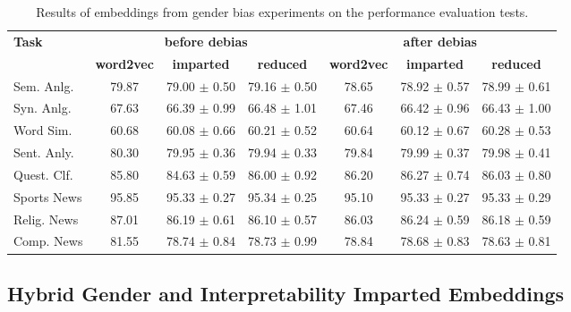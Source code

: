 \documentclass[11pt,a4paper]{article}
\begin{document}
\begin{table}
    \centering
	\begin{tabular}{lcccccc}
		\hline \hline 
		\multirow{2}{*}{\textbf{Task}} & \multicolumn{3}{c}{\textbf{before debias}} & 
		\multicolumn{3}{c}{\textbf{after debias}} \\
		 & \textbf{word2vec} & \textbf{imparted} & \textbf{reduced} & \textbf{word2vec} & \textbf{imparted} & \textbf{reduced} \\ \hline \hline %
	    Sem. Anlg. & 79.87 & 79.00 $\pm$ 0.50 & 79.16 $\pm$ 0.50 & 78.65 & 78.92 $\pm$ 0.57 & 78.99 $\pm$ 0.61 \\
	    Syn. Anlg. & 67.63 & 66.39 $\pm$ 0.99 & 66.48 $\pm$ 1.01 & 67.46 & 66.42 $\pm$ 0.96 & 66.43 $\pm$ 1.00 \\ 
	    \hline %
	    Word Sim. & 60.68 & 60.08 $\pm$ 0.66 & 60.21 $\pm$ 0.52 & 60.64 & 60.12 $\pm$ 0.67 & 60.28 $\pm$ 0.53 \\
	    \hline %
	    Sent. Anly. & 80.30 & 79.95 $\pm$ 0.36 & 79.94 $\pm$ 0.33 & 79.84 & 79.99 $\pm$ 0.37 & 79.98 $\pm$ 0.41 \\ \hline %
	    Quest. Clf. & 85.80 & 84.63 $\pm$ 0.59 & 86.00 $\pm$ 0.92 & 86.20 & 86.27 $\pm$ 0.74 & 86.03 $\pm$ 0.80 \\ \hline %
	    Sports News & 95.85 & 95.33 $\pm$ 0.27 & 95.34 $\pm$ 0.25 & 95.10 & 95.33 $\pm$ 0.27 & 95.33 $\pm$ 0.29 \\
	    Relig. News & 87.01 & 86.19 $\pm$ 0.61 & 86.10 $\pm$ 0.57 & 86.03 & 86.24 $\pm$ 0.59 & 86.18 $\pm$ 0.59 \\
	    Comp. News & 81.55 & 78.74 $\pm$ 0.84 & 78.73 $\pm$ 0.99 & 78.84 & 78.68 $\pm$ 0.83 & 78.63 $\pm$ 0.81 \\ \hline \hline %
	\end{tabular}
	\caption{Results of embeddings from gender bias experiments on the performance evaluation tests. }
	\label{tab:gender_performance_tests}
\end{table}








\subsection{Hybrid Gender and Interpretability Imparted Embeddings}
\end{document}
